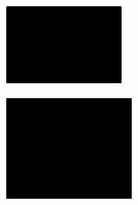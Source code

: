 \begin{figure}[h]
\begin{subfigure}[b]{0.18\textwidth}
         \caption{}
     \end{subfigure}
     \hfill
     \begin{subfigure}[b]{0.18\textwidth}
         \centering
         \includegraphics[width=\textwidth]{images/results/base/greenland.205.color.d3_y.png}
         \caption{}
     \end{subfigure}
    \hfill
     \begin{subfigure}[b]{0.18\textwidth}
         \centering
         \includegraphics[width=\textwidth]{images/results/base/greenland.205.color.d3_skinny.png}
         \caption{}
     \end{subfigure}
    \hfill
     \begin{subfigure}[b]{0.18\textwidth}
         \centering

\end{subfigure}
\end{figure}
